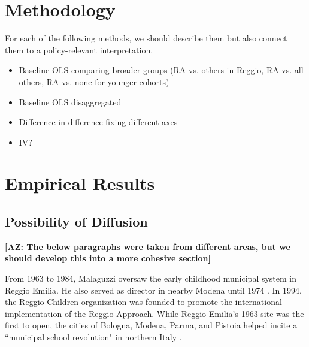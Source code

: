 \section{Methodology}
\label{sec:methodology}
For each of the following methods, we should describe them but also connect them to a policy-relevant interpretation.

\begin{itemize}
\item Baseline OLS comparing broader groups (RA vs. others in Reggio, RA vs. all others, RA vs. none for younger cohorts)
\item Baseline OLS disaggregated
\item Difference in difference fixing different axes
\item IV? 
\end{itemize}

\section{Empirical Results}
\label{sec:results}

\subsection{Possibility of Diffusion}
\label{sec:diffusion}

\textbf{[AZ: The below paragraphs were taken from different areas, but we should develop this into a more cohesive section]}

From 1963 to 1984, Malaguzzi oversaw the early childhood municipal system in Reggio Emilia. He also served as director in nearby Modena until 1974 \citep{Cagliari-etal-eds_2016_BOOK_Loris-Malaguzzi}. In 1994, the Reggio Children organization was founded to promote the international implementation of the Reggio Approach. While Reggio Emilia's 1963 site was the first to open, the cities of Bologna, Modena, Parma, and Pistoia helped incite a ``municipal school revolution" in northern Italy \citep{Hohnerlein_2015_Development-and-Diffusion}. 

